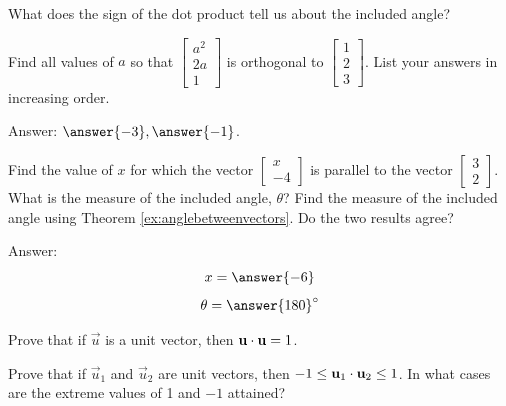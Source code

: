 \documentclass{ximera}
\begin{document}
\begin{problem}\label{prob:dotproductsign}
What does the sign of the dot product tell us about the included angle?
\end{problem}

\begin{problem}\label{prob:orthvectorsdot}
Find all values of $a$ so that $\begin{bmatrix}a^2\\2a\\1\end{bmatrix}$ is orthogonal to $\begin{bmatrix}1\\2\\3\end{bmatrix}$.  List your answers in increasing order.

Answer: $\answer{-3}, \answer{-1}$.
\end{problem}

\begin{problem}\label{prob:parallelvectdot}
Find the value of $x$ for which the vector $\begin{bmatrix}x\\-4\end{bmatrix}$ is parallel to the vector $\begin{bmatrix}3\\2\end{bmatrix}$. What is the measure of the included angle, $\theta$? Find the measure of the included angle using Theorem \ref{ex:anglebetweenvectors}.  Do the two results agree?

Answer: 
$$x=\answer{-6}$$
$$\theta=\answer{180}^\circ$$
\end{problem}

\begin{problem}\label{prob:unitvectordot}
Prove that if $\vec{u}$ is a unit vector, then $\mathbf{u}\cdot \mathbf{u}=1$.
\end{problem}

\begin{problem}\label{prob:unitvectordot1}
 Prove that if $\vec{u}_1$ and $\vec{u}_2$ are unit vectors, then $-1\leq\mathbf{u}_1\cdot \mathbf{u}_2\leq 1$.  In what cases are the extreme values of 1 and $-1$ attained?
\end{problem} 
\end{document}
